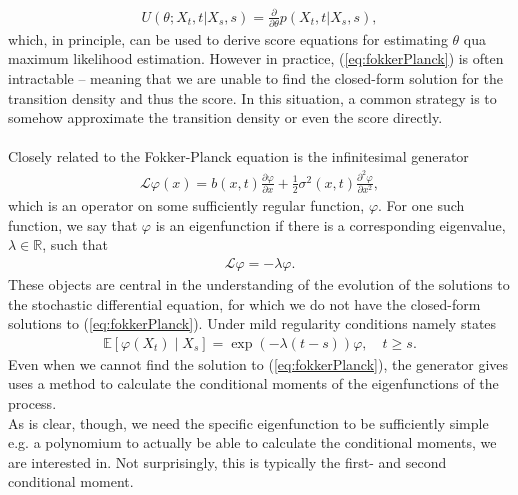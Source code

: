\begin{align}
    U(\theta; X_t, t | X_s, s) = \frac{\partial}{\partial\theta}p(X_t, t | X_s, s), \label{eq:transitionScore}
\end{align}
which, in principle, can be used to derive score equations for estimating $\theta$ qua maximum likelihood estimation. However in practice, (\ref{eq:fokkerPlanck}) is often intractable – meaning that we are unable to find the closed-form solution for the transition density and thus the score. In this situation, a common strategy is to somehow approximate the transition density or even the score directly. \\\\
Closely related to the Fokker-Planck equation is the infinitesimal generator 
\begin{align}
    \mathcal{L}\varphi(x) = b(x, t) \frac{\partial\varphi}{\partial x} + \frac{1}{2}\sigma^2(x, t)\frac{\partial^2\varphi}{\partial x^2} \label{eq:infinitesemalGeneratorDefinition},
\end{align}
which is an operator on some sufficiently regular function, $\varphi$. For one such function, we say that $\varphi$ is an eigenfunction if there is a corresponding eigenvalue, $\lambda\in\mathbb{R}$, such that
\begin{align}
    \mathcal{L}\varphi = -\lambda\varphi.
\end{align} 
These objects are central in the understanding of the evolution of the solutions to the stochastic differential equation, for which we do not have the closed-form solutions to (\ref{eq:fokkerPlanck}). Under mild regularity conditions \cite[theorem 1.16]{StatisticalMethodsForSDE} namely states
\begin{align}
    \mathbb{E}\left[\varphi(X_{t}) \middle | X_{s}\right] = \exp\left(-\lambda \left(t - s\right)\right)\varphi \label{eq:momentConditions}, \quad t\geq s.
\end{align}
Even when we cannot find the solution to (\ref{eq:fokkerPlanck}), the generator gives uses a method to calculate the conditional moments of the eigenfunctions of the process.\\
As is clear, though, we need the specific eigenfunction to be sufficiently simple e.g. a polynomium to actually be able to calculate the conditional moments, we are interested in. Not surprisingly, this is typically the first- and second conditional moment.
